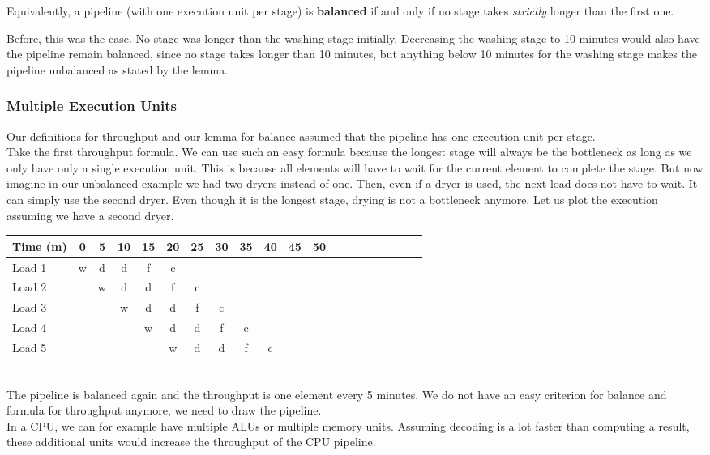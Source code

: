 \documentclass[main.tex]{subfiles}
\begin{document}
\begin{lemma}
    Equivalently, a pipeline (with one execution unit per stage) is \textbf{balanced} if and only if no stage takes \textit{strictly} longer than the first one.
\end{lemma}
\noindent Before, this was the case. No stage was longer than the washing stage initially. Decreasing the washing stage to 10 minutes would also have the pipeline remain balanced, since no stage takes longer than 10 minutes, but anything below 10 minutes for the washing stage makes the pipeline unbalanced as stated by the lemma.

\subsubsection{Multiple Execution Units}
Our definitions for throughput and our lemma for balance assumed that the pipeline has one execution unit per stage.\\
Take the first throughput formula. We can use such an easy formula because the longest stage will always be the bottleneck as long as we only have only a single execution unit. This is because all elements will have to wait for the current element to complete the stage. But now imagine in our unbalanced example we had two dryers instead of one. Then, even if a dryer is used, the next load does not have to wait. It can simply use the second dryer. Even though it is the longest stage, drying is not a bottleneck anymore. Let us plot the execution assuming we have a second dryer.\\[3mm]
\begin{tabular}{l | *{19}{c}}
    Time (m) & 0 & 5 & 10 & 15 & 20 & 25 & 30 & 35 & 40 & 45 & 50 \\
    \hline
    Load 1 & w & d & d & f & c\\
    Load 2 &   & w & d & d & f & c\\
    Load 3 &   &   & w &  d & d & f & c \\
    Load 4 &   &   &   & w & d & d & f & c \\
    Load 5 &   &   &   &   & w &  d & d & f & c
\end{tabular} \\[3mm]
The pipeline is balanced again and the throughput is one element every 5 minutes. We do not have an easy criterion for balance and formula for throughput anymore, we need to draw the pipeline.\\
In a CPU, we can for example have multiple ALUs or multiple memory units. Assuming decoding is a lot faster than computing a result, these additional units would increase the throughput of the CPU pipeline.
\end{document}
